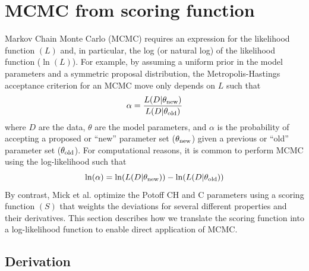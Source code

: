 \documentclass[preprint,review,11pt]{elsarticle}
\begin{document}
    \clearpage
	\newpage
	
	\section{MCMC from scoring function} \label{SI:MCMC from scoring function}
	
	Markov Chain Monte Carlo (MCMC) requires an expression for the likelihood function $(L)$ and, in particular, the log (or natural log) of the likelihood function ($\ln(L)$). For example, by assuming a uniform prior in the model parameters and a symmetric proposal distribution, the Metropolis-Hastings acceptance criterion for an MCMC move only depends on $L$ such that
	\begin{equation}
	\alpha = \frac{L(D|\theta_{\rm new})}{L(D|\theta_{\rm old})}
	\end{equation}
	where $D$ are the data, $\theta$ are the model parameters, and $\alpha$ is the probability of accepting a proposed or ``new'' parameter set ($\theta_{\rm new}$) given a previous or ``old'' parameter set ($\theta_{\rm old}$). For computational reasons, it is common to perform MCMC using the log-likelihood such that 
	\begin{equation} \label{eq:log-alpha}
	\ln(\alpha) = \ln(L(D|\theta_{\rm new})) - \ln(L(D|\theta_{\rm old}))
	\end{equation}
	By contrast, Mick et al. optimize the Potoff CH and C parameters using a scoring function $(S)$ that weights the deviations for several different properties and their derivatives. This section describes how we translate the scoring function into a log-likelihood function to enable direct application of MCMC.
	
	\subsection{Derivation}
		
\end{document}
